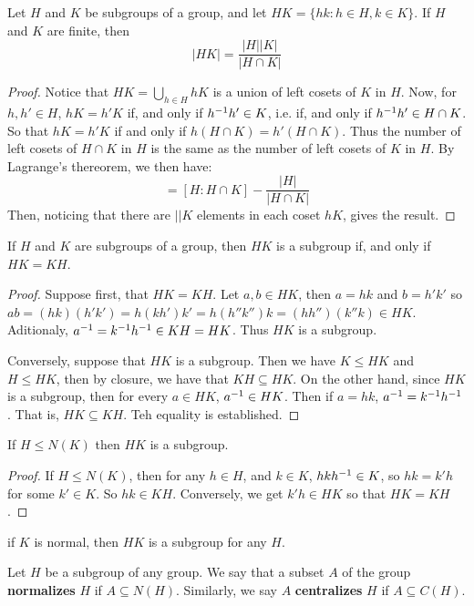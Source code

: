 \begin{theorem}\label{lemma_3.3.6}
  Let $H$ and  $K$ be subgroups of a group, and let  $HK=\{hk : h \in H, k \in
  K\}$. If $H$ and $K$ are finite, then
  \begin{equation}
    |HK|=\frac{|H||K|}{|H \cap K|}
  \end{equation}
\end{theorem}
\begin{proof}
  Notice that $HK=\bigcup_{h \in H}{hK}$ is a union of left cosets of $K$ in
  $H$. Now, for  $h,h' \in H$,  $hK=h'K$ if, and only if  $h^{-1}h' \in K$,
  i.e. if, and only if $h^{-1}h' \in H \cap K$. So that $hK=h'K$ if and only
  if  $h(H \cap K)=h'(H \cap K)$. Thus the number of left cosets of $H \cap K$
  in $H$ is the same as the number of left cosets of  $K$ in  $H$. By
  Lagrange's thereorem, we then have:
  \begin{equation*}
    [ H : K ]=[ H : H \cap K ]-\frac{|H|}{|H \cap K|}
  \end{equation*}
  Then, noticing that there are $||K$ elements in each coset $hK$, gives
  the result.
\end{proof}

\begin{lemma}\label{lemma_3.3.7}
  If $H$ and $K$ are subgroups of a group, then $HK$ is a subgroup if, and
  only if  $HK=KH$.
\end{lemma}
\begin{proof}
  Suppose first, that $HK=KH$. Let $a,b \in HK$, then $a=hk$ and  $b=h'k'$ so
  $ab=(hk)(h'k')=h(kh')k'=h(h''k'')k=(hh'')(k''k) \in HK$. Aditionaly,
  $a^{-1}=k^{-1}h^{-1} \in KH=HK$. Thus $HK$ is a subgroup.

  Conversely, suppose that  $HK$ is a subgroup. Then we have  $K \leq HK$ and
  $H \leq HK$, then by closure, we have that  $KH \subseteq HK$. On the
  other hand, since  $HK$ is a subgroup, then for every  $a \in HK$,
  $a^{-1} \in HK$. Then if $a=hk$,  $a^{-1}=k^{-1}h^{-1}$. That is, $HK
  \subseteq KH$. Teh equality is established.
\end{proof}
\begin{corollary}
  If $H \leq N(K)$ then $HK$ is a subgroup.
\end{corollary}
\begin{proof}
  If $H \leq N(K)$, then for any $h \in H$, and  $k \in K$,  $hkh^{-1} \in
  K$, so $hk=k'h$ for some  $k' \in K$. So  $hk \in KH$. Conversely, we get
  $k'h \in HK$ so that  $HK=KH$.
\end{proof}
\begin{corollary}
  if $K$ is normal, then $HK$ is a subgroup for any $H$.
\end{corollary}

\begin{definition}
  Let $H$ be a subgroup of any group. We say that a subset $A$ of the group
  \textbf{normalizes} $H$ if  $A \subseteq N(H)$. Similarly, we say $A$
  \textbf{centralizes} $H$ if  $A \subseteq C(H)$.
\end{definition}
